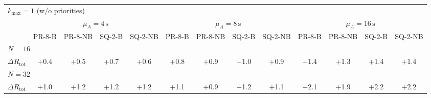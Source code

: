 \begin{tabular}{l c c c c c c c c c c c c}
\toprule
\multicolumn{13}{l}{$k_{\max}=1$ (w/o priorities)} \\
\addlinespace[0.2em]
 & \multicolumn{4}{c}{$\mu_A=4\,\mathrm{s}$} & \multicolumn{4}{c}{$\mu_A=8\,\mathrm{s}$} & \multicolumn{4}{c}{$\mu_A=16\,\mathrm{s}$} \\
\cmidrule(lr){2-5}\cmidrule(lr){6-9}\cmidrule(lr){10-13}
 & PR-8-B & PR-8-NB & SQ-2-B & SQ-2-NB & PR-8-B & PR-8-NB & SQ-2-B & SQ-2-NB & PR-8-B & PR-8-NB & SQ-2-B & SQ-2-NB \\
\midrule
\multicolumn{13}{l}{${N=16}$} \\
\midrule
$\Delta R_{\mathrm{tot}}$ & +0.4 & +0.5 & +0.7 & +0.6 & +0.8 & +0.9 & +1.0 & +0.9 & +1.4 & +1.3 & +1.4 & +1.4 \\
\midrule
\multicolumn{13}{l}{${N=32}$} \\
\midrule
$\Delta R_{\mathrm{tot}}$ & +1.0 & +1.2 & +1.2 & +1.2 & +1.1 & +0.9 & +1.2 & +1.1 & +2.1 & +1.9 & +2.2 & +2.2 \\
\bottomrule
\end{tabular}

